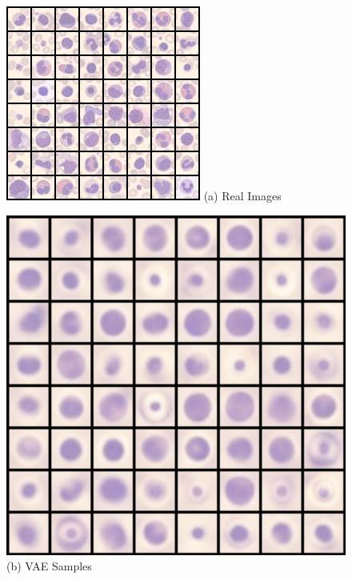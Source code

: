 \begin{figure}
    \centering

    \begin{minipage}[t]{0.48\textwidth}
        \centering
        \includegraphics[width=\linewidth]{images/real.png}
        (a) Real Images
    \end{minipage}
    \hfill
    \begin{minipage}[t]{0.48\textwidth}
        \centering
        \includegraphics[width=\linewidth]{images/vae.png}
        (b) VAE Samples
    \end{minipage}


\end{figure}
